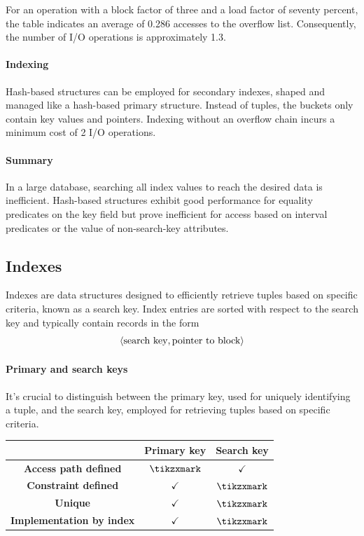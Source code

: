 \begin{example}
    For an operation with a block factor of three and a load factor of seventy percent, the table indicates an average of 0.286 accesses to the overflow list. 
    Consequently, the number of I/O operations is approximately 1.3.
\end{example} 

\paragraph*{Indexing}
Hash-based structures can be employed for secondary indexes, shaped and managed like a hash-based primary structure. 
Instead of tuples, the buckets only contain key values and pointers.
Indexing without an overflow chain incurs a minimum cost of 2 I/O operations.

\paragraph*{Summary}
In a large database, searching all index values to reach the desired data is inefficient. 
Hash-based structures exhibit good performance for equality predicates on the key field but prove inefficient for access based on interval predicates or the value of non-search-key attributes.

\subsection{Indexes}
Indexes are data structures designed to efficiently retrieve tuples based on specific criteria, known as a search key.
Index entries are sorted with respect to the search key and typically contain records in the form 
\[\left\langle \textnormal{search key}, \textnormal{pointer to block}\right\rangle \]

\paragraph*{Primary and search keys}
It's crucial to distinguish between the primary key, used for uniquely identifying a tuple, and the search key, employed for retrieving tuples based on specific criteria.
\begin{table}[H]
    \centering
    \begin{tabular}{c|cc|}
    \cline{2-3}
                                                           & \textbf{Primary key} & \textbf{Search key} \\ \hline
    \multicolumn{1}{|c|}{\textbf{Access path defined}}     & $\tikzxmark$         & $\checkmark$        \\
    \multicolumn{1}{|c|}{\textbf{Constraint defined}}      & $\checkmark$         & $\tikzxmark$        \\
    \multicolumn{1}{|c|}{\textbf{Unique}}                  & $\checkmark$         & $\tikzxmark$        \\
    \multicolumn{1}{|c|}{\textbf{Implementation by index}} & $\checkmark$         & $\tikzxmark$        \\ \hline
    \end{tabular}
\end{table}

